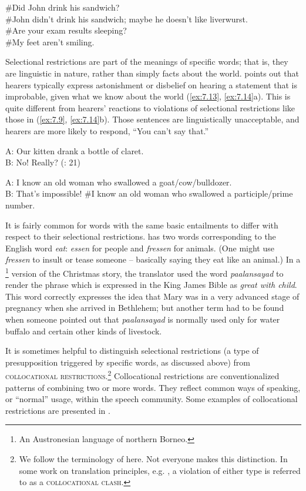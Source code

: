\ea \label{ex:7.12}
\ea \#Did John drink his sandwich?\\
\ex \#John didn’t drink his sandwich; maybe he doesn’t like liverwurst.\\
\ex \#Are your exam results sleeping?\\
\ex \#My feet aren’t smiling.
                       \z
\z

\largerpage[-1]%
Selectional restrictions are part of the meanings of specific words; that is, they are linguistic in nature, rather than simply facts about the world. \citet[21]{Cruse1986} points out that hearers typically express astonishment or disbelief on hearing a statement that is improbable, given what we know about the world (\ref{ex:7.13}, \ref{ex:7.14}a). This is quite different from hearers’ reactions to violations of selectional restrictions like those in (\ref{ex:7.9}, \ref{ex:7.14}b). Those sentences are linguistically unacceptable, and hearers are more likely to respond, “You can’t say that.”\largerpage[-1]%

\ea \label{ex:7.13}
A: Our kitten drank a bottle of claret.\\
B: No! Really?  (\citealt{Cruse1986}: 21)
\z
 
\ea \label{ex:7.14}
\ea A: I know an old woman who swallowed a goat/cow/bulldozer.\\
B: That’s impossible!
\ex \#I know an old woman who swallowed a participle/prime number.
\z
\z

It is fairly common for words with the same basic entailments to differ with respect to their selectional restrictions.  has two words corresponding to the English word \textit{eat}: \textit{essen} for people and \textit{fressen} for animals. (One might use \textit{fressen} to insult or tease someone – basically saying they eat like an animal.) In a \footnote{An {Austronesian} language of northern Borneo.} version of the Christmas story, the translator used the word \textit{paalansayad} to render the phrase which is expressed in the King James Bible as \textit{great with child}. This word correctly expresses the idea that Mary was in a very advanced stage of pregnancy when she arrived in Bethlehem; but another term had to be found when someone pointed out that \textit{paalansayad} is normally used only for water buffalo and certain other kinds of livestock.



It is sometimes helpful to distinguish selectional restrictions (a type of presupposition triggered by specific words, as discussed above) from \textsc{collocational restrictions}.\footnote{We follow the terminology of \citet[107, 279--280]{Cruse1986} here. Not everyone makes this distinction. In some work on translation principles, e.g. \citet{BeekmanCallow1974}, a violation of either type is referred to as a \textsc{collocational clash}.} Collocational restrictions are conventionalized patterns of combining two or more words. They reflect common ways of speaking, or “normal” usage, within the speech community. Some examples of collocational restrictions are presented in .


